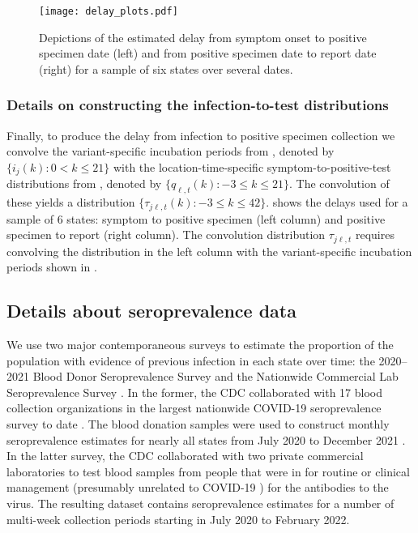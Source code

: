 \begin{figure}[t!]
\centering
    \texttt{[image: delay\_plots.pdf]} 
    \caption{Depictions of the estimated delay from symptom onset to
    positive specimen date (left) and from positive specimen date to report date
    (right) for a sample of six states over several dates.}
    \label{fig:delay-plots-samp}
\end{figure}

\subsubsection{Details on constructing the infection-to-test distributions}
\label{supp:details-conv}

Finally, to produce the delay from infection to positive specimen collection we
convolve the variant-specific incubation periods from ,
denoted by $\{i_{j}(k) : 0 < k \leq 21\}$ with the location-time-specific
symptom-to-positive-test distributions from , denoted by
$\{q_{\ell,t}(k) : -3\leq k \leq 21\}$. The convolution of these yields a
distribution $\{\tau_{j\ell,t}(k): -3 \leq k
\leq 42\}$.  shows the delays used for a sample of 6
states: symptom to positive specimen (left column) and positive specimen to report
(right column). The convolution distribution $\tau_{j\ell,t}$ requires
convolving the distribution in the left column with the variant-specific
incubation periods shown in .





\subsection{Details about seroprevalence data}
\label{supp:sero-details}

We use two major contemporaneous surveys to estimate the proportion of the
population with evidence of previous infection in each state over time: the
2020--2021 Blood Donor Seroprevalence Survey and the Nationwide Commercial Lab
Seroprevalence Survey \citep{cdc2021blood, cdc2021comm}. In the former, the CDC
collaborated with 17 blood collection organizations in the largest nationwide
COVID-19 seroprevalence survey to date \citep{cdc2021blood}. The blood donation
samples were used to construct monthly seroprevalence estimates for nearly all
states from July 2020 to December 2021 \citep{jones2021estimated}. In the latter
survey, the CDC collaborated with two private commercial laboratories to test
blood samples from people that were in for routine or clinical management
(presumably unrelated to COVID-19 \citealp{bajema2021estimated}) for the
antibodies to the virus. The resulting dataset contains seroprevalence estimates
for a number of multi-week collection periods starting in July 2020 to February
2022. 

